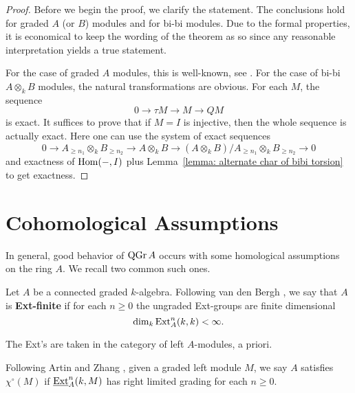 \begin{proof}
  Before we begin the proof, we clarify the statement. The conclusions hold for graded \(A\) (or \(B\)) modules and for bi-bi modules. Due to the formal properties, it is economical to keep the wording of the theorem as so since any reasonable interpretation yields a true statement. 
  
  For the case of graded \(A\) modules, this is well-known, see \parencite[Property 4.6]{BVdB}. For the case of bi-bi \(A \otimes_k B\) modules, the natural transformations are obvious. For each \(M\), the sequence 
  \begin{displaymath}
    0 \to \tau M \to M \to Q M
  \end{displaymath}
  is exact. It suffices to prove that if \(M = I\) is injective, then the whole sequence is actually exact. Here one can use the system of exact sequences
  \begin{displaymath}
    0 \to A_{\geq n_1} \otimes_k B_{\geq n_2} \to A \otimes_k B \to (A \otimes_k B) / A_{\geq n_1} \otimes_k B_{\geq n_2} \to 0
  \end{displaymath}
  and exactness of \(\operatorname{Hom}(-,I)\) plus Lemma~\ref{lemma: alternate char of bibi torsion} to get exactness. 
\end{proof}

\section{Cohomological Assumptions}

In general, good behavior of \(\operatorname{QGr}A\) occurs with some homological assumptions on the ring \(A\). We recall two common such ones. 

\begin{definition} \label{definition: Ext-finite}
  Let \(A\) be a connected graded \(k\)-algebra. Following van den Bergh \parencite{VdB}, we say that \(A\) is \textbf{Ext-finite} if for each \(n \geq 0\) the ungraded Ext-groups are finite dimensional 
  \begin{displaymath}
    \operatorname{dim}_k \operatorname{Ext}_A^n (k,k) < \infty.
  \end{displaymath}
\end{definition}

\begin{remark}
  The Ext's are taken in the category of left \(A\)-modules, a priori. 
\end{remark}

\begin{definition} \label{definition: chi}
  Following Artin and Zhang \parencite{AZ94}, given a graded left module \(M\), we say \(A\) satisfies \(\chi^\circ(M)\) if \(\underline{\operatorname{Ext}}^n_A(k,M)\) has right limited grading for each \(n \geq 0\). 

\end{definition}


